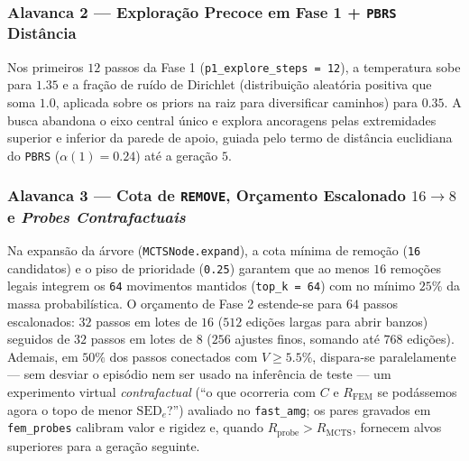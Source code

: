 \documentclass[11pt,a4paper]{article}
\begin{document}
\subsubsection{Alavanca 2 — Exploração Precoce em Fase 1 + \texttt{PBRS} Distância}
Nos primeiros $12$ passos da Fase 1 (\texttt{p1\_explore\_steps = 12}), a temperatura sobe para $1.35$ e a fração de ruído de Dirichlet (distribuição aleatória positiva que soma $1.0$, aplicada sobre os priors na raiz para diversificar caminhos) para $0.35$. A busca abandona o eixo central único e explora ancoragens pelas extremidades superior e inferior da parede de apoio, guiada pelo termo de distância euclidiana do \texttt{PBRS} ($\alpha(1)=0.24$) até a geração $5$.

\subsubsection{Alavanca 3 — Cota de \texttt{REMOVE}, Orçamento Escalonado $16 \to 8$ e \emph{Probes Contrafactuais}}
Na expansão da árvore (\texttt{MCTSNode.expand}), a cota mínima de remoção (\texttt{16} candidatos) e o piso de prioridade (\texttt{0.25}) garantem que ao menos $16$ remoções legais integrem os \texttt{64} movimentos mantidos (\texttt{top\_k = 64}) com no mínimo $25\%$ da massa probabilística. O orçamento de Fase 2 estende-se para $64$ passos escalonados: $32$ passos em lotes de $16$ ($512$ edições largas para abrir banzos) seguidos de $32$ passos em lotes de $8$ ($256$ ajustes finos, somando até $768$ edições). Ademais, em $50\%$ dos passos conectados com $V \ge 5.5\%$, dispara-se paralelamente — sem desviar o episódio nem ser usado na inferência de teste — um experimento virtual \emph{contrafactual} (``o que ocorreria com $C$ e $R_{\mathrm{FEM}}$ se podássemos agora o topo de menor $\mathrm{SED}_e$?'') avaliado no \texttt{fast\_amg}; os pares gravados em \texttt{fem\_probes} calibram valor e rigidez e, quando $R_{\mathrm{probe}} > R_{\mathrm{MCTS}}$, fornecem alvos superiores para a geração seguinte.
\end{document}
